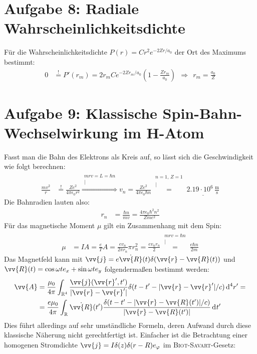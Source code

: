 \documentclass[a4paper,12pt]{article}
\newcommand{\kom}{}
\newcommand{\intx}{}
\begin{document}
\section*{Aufgabe 8: Radiale Wahrscheinlichkeitsdichte}
Für die Wahrscheinlichkeitsdichte $P(r)=Cr^2e^{-2Zr/a_0}$ der Ort des Maximums bestimmt:
\begin{align*}
0&\overset{!}{=} P'(r_m)=2r_mCe^{-2Zr_m/a_0}(1-\frac{Zr_m}{a_0})\ \ \Rightarrow\ \ r_m=\frac{a_0}{Z}
\end{align*}
\section*{Aufgabe 9: Klassische Spin-Bahn-Wechselwirkung im H-Atom}
Fasst man die Bahn des Elektrons als Kreis auf, so lässt sich die Geschwindigkeit wie folgt berechnen:
\begin{align*}
\frac{mv^2}{r}&\overset{!}{=}\frac{Ze^2}{4\pi\epsilon_0r^2}\kom\overset{\substack{{mrv=L=\hbar n} \\ |}}{\Rightarrow}v_n=\frac{Ze^2}{4\pi\epsilon_0\hbar n}\kom\overset{\substack{{n=1,\, Z=1} \\ |}}{=}\underline{2.19\cdot 10^6\,\mathrm{\frac{m}{s}}}
\end{align*}
Die Bahnradien lauten also:
\begin{align*}
r_n&=\frac{\hbar n}{mv}=\frac{4\pi\epsilon_0\hbar^2n^2}{Zme^2}
\end{align*}
Für das magnetische Moment $\mu $ gilt ein Zusammenhang mit dem Spin:
\begin{align*}
\mu&=IA=\frac{e}{T}A=\frac{ev_n}{2\pi r_n}\pi r_n^2=\frac{ev_nr_n}{2}\kom\overset{\substack{{mrv=\hbar n} \\ |}}{=}\frac{e\hbar n}{2m}
\end{align*}
Das Magnetfeld kann mit $\vv{j}=e\dot{\vv{R}}(t)\delta(\vv{r}-\vv{R}(t))$ und $\vv{R}(t)=\cos\omega te_x+\sin\omega te_y$ folgendermaßen bestimmt werden:
\begin{align*}
\vv{A}&=\frac{\mu_0}{4\pi}\intx\int_{\mathbb{R}^{4}}{\frac{\vv{j}(\vv{r}',t')}{|\vv{r}-\vv{r}'|}\delta(t-t'-|\vv{r}-\vv{r}'|/c)}\,\mathrm{d}^{4}r'=\\
&=\frac{e\mu_0}{4\pi}\intx\int_{\mathbb{R}^{ }}{\dot{\vv{R}}(t')\frac{\delta(t-t'-|\vv{r}-\vv{R}(t')|/c)}{|\vv{r}-\vv{R}(t')|}}\,\mathrm{d}^{ }t'
\end{align*}
Dies führt allerdings auf sehr umständliche Formeln, deren Aufwand durch diese klassische Näherung nicht gerechtfertigt ist. Einfacher ist die Betrachtung einer homogenen Stromdichte $\vv{j}=I\delta(z)\delta(r-R)e_\varphi$ im \textsc{Biot-Savart}-Gesetz:
\end{document}
